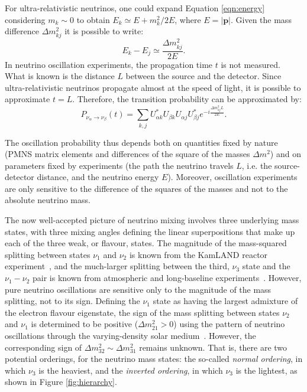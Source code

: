 For ultra-relativistic neutrinos, one could expand Equation \eqref{eqn:energy} considering $m_k \sim 0$ to obtain $E_k \simeq E + {m_k^2}/{2E}$, where $E=|\mathbf{p}|$. Given the mass difference $\Delta m_{kj}^2$ it is possible to write:
\begin{equation}
E_k-E_j\simeq \frac{\Delta m_{kj}^2}{2E}.
\end{equation}
In neutrino oscillation experiments, the propagation time $t$ is not measured. What is known is the distance $L$ between the source and the detector. Since ultra-relativistic neutrinos propagate almost at the speed of light, it is possible to approximate $t = L$. Therefore, the transition probability can be approximated by:
\begin{equation}
\label{eqn:prob1}
P_{{\nu_\alpha} \rightarrow {\nu_\beta}} (t) = \sum_{k,j} U^*_{\alpha k}U_{\beta k} U_{\alpha j} U^*_{\beta j} e^{-i \frac{\Delta m_{kj}^2 L}{2E}}.
\end{equation}

The oscillation probability thus depends both on quantities fixed by nature (PMNS matrix elements and differences of the square of the masses $\Delta m^2$) and on parameters fixed by experiments (the path the neutrino travels $L$, i.e. the source-detector distance, and the neutrino energy $E$).
Moreover, oscillation experiments are only sensitive to the difference of the squares of the masses and not to the absolute neutrino mass.

The now well-accepted picture of neutrino mixing involves three underlying mass states, with three mixing angles defining the linear superpositions that make up each of the three weak, or flavour, states. The magnitude of the mass-squared splitting between states $\nu_1$ and $\nu_2$ is known from the KamLAND reactor experiment~\cite{kamland}, and the much-larger splitting between the third, $\nu_3$ state and the $\nu_1 - \nu_2$ pair is known from atmospheric and long-baseline experiments~\cite{pdg}. However, pure neutrino oscillations are sensitive only to the magnitude of the mass splitting, not to its sign. Defining the $\nu_1$ state as having the largest admixture of the electron flavour eigenstate, the sign of the mass splitting between states $\nu_2$ and $\nu_1$ is determined to be positive ($\Delta m^2_{21} > 0$) using the pattern of neutrino oscillations through the varying-density solar medium~\cite{pdg}. However, the corresponding sign of $\Delta m^2_{32} \sim \Delta m^2_{31}$ remains unknown. That is, there are two potential orderings, for the neutrino mass states: the so-called \emph{normal ordering}, in which $\nu_3$ is the heaviest, and the \emph{inverted ordering}, in which $\nu_3$ is the lightest, as shown in Figure \ref{fig:hierarchy}.\\

